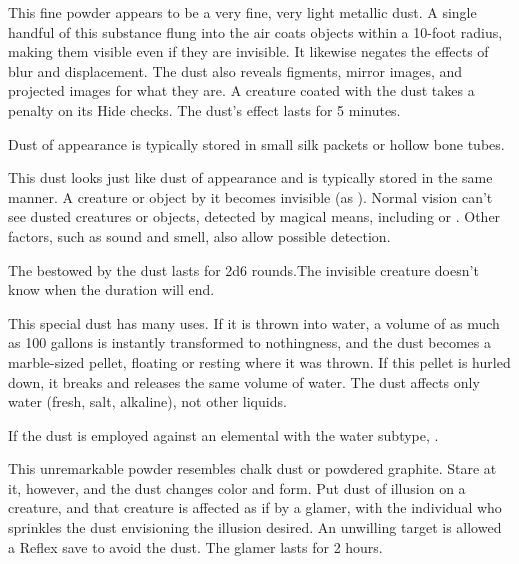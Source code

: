 { This fine powder appears to be a very fine, very light metallic dust. A single handful of this substance flung into the air coats objects within a 10-foot radius, making them visible even if they are invisible. It likewise negates the effects of blur and displacement. The dust also reveals figments, mirror images, and projected images for what they are. A creature coated with the dust takes a  penalty on its Hide checks. The dust's effect lasts for 5 minutes.

Dust of appearance is typically stored in small silk packets or hollow bone tubes.


 This dust looks just like dust of appearance and is typically stored in the same manner. A creature or object  by it becomes invisible (as ). Normal vision can't see dusted creatures or objects,  detected by magical means, including  or . Other factors, such as sound and smell, also allow possible detection.

The  bestowed by the dust lasts for 2d6 rounds.The invisible creature doesn't know when the duration will end.


 This special dust has many uses. If it is thrown into water, a volume of as much as 100 gallons is instantly transformed to nothingness, and the dust becomes a marble-sized pellet, floating or resting where it was thrown. If this pellet is hurled down, it breaks and releases the same volume of water. The dust affects only water (fresh, salt, alkaline), not other liquids.

If the dust is employed against an elemental with the water subtype, .


 This unremarkable powder resembles chalk dust or powdered graphite. Stare at it, however, and the dust changes color and form. Put dust of illusion on a creature, and that creature is affected as if by a  glamer, with the individual who sprinkles the dust envisioning the illusion desired. An unwilling target is allowed a Reflex save to avoid the dust. The glamer lasts for 2 hours.

}
